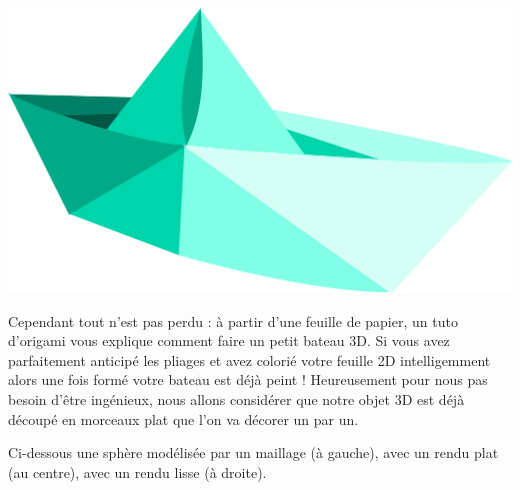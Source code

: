 \documentclass[11pt,class=report,crop=false]{standalone}
\begin{document}
\begin{center}
\includegraphics[scale=\myscale,scale=0.4]{figures/badaman-paper-boat}
\end{center}

Cependant tout n'est pas perdu : à partir d'une feuille de papier, un tuto d'origami vous explique comment faire un petit bateau 3D. Si vous avez parfaitement anticipé les pliages et avez colorié votre feuille 2D intelligemment alors une fois formé votre bateau est déjà peint !
Heureusement pour nous pas besoin d'être ingénieux, nous allons considérer que notre objet 3D est déjà découpé en morceaux plat que l'on va décorer un par un.

Ci-dessous une sphère modélisée par un maillage (à gauche), avec un rendu plat (au centre), avec un rendu lisse (à droite).
\end{document}
